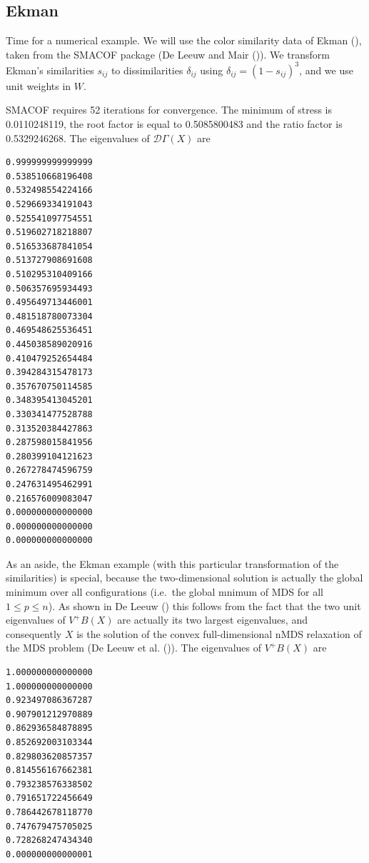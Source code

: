 \documentclass[
  12pt,
  letterpaper,
  DIV=11,
  numbers=noendperiod]{scrartcl}
\begin{document}
\subsection{Ekman}\label{ekman}

Time for a numerical example. We will use the color similarity data of
Ekman (), taken from the SMACOF package (De
Leeuw and Mair ()). We transform
Ekman's similarities \(s_{ij}\) to dissimilarities \(\delta_{ij}\) using
\(\delta_{ij}=(1-s_{ij})^3\), and we use unit weights in \(W\).

SMACOF requires 52 iterations for convergence. The minimum of stress is
0.0110248119, the root factor is equal to 0.5085800483 and the ratio
factor is 0.5329246268. The eigenvalues of \(\mathcal{D}\Gamma(X)\) are

\begin{verbatim}
0.999999999999999 
0.538510668196408 
0.532498554224166 
0.529669334191043 
0.525541097754551 
0.519602718218807 
0.516533687841054 
0.513727908691608 
0.510295310409166 
0.506357695934493 
0.495649713446001 
0.481518780073304 
0.469548625536451 
0.445038589020916 
0.410479252654484 
0.394284315478173 
0.357670750114585 
0.348395413045201 
0.330341477528788 
0.313520384427863 
0.287598015841956 
0.280399104121623 
0.267278474596759 
0.247631495462991 
0.216576009083047 
0.000000000000000 
0.000000000000000 
0.000000000000000 
\end{verbatim}

As an aside, the Ekman example (with this particular transformation of
the similarities) is special, because the two-dimensional solution is
actually the global minimum over all configurations (i.e.~the global
mnimum of MDS for all \(1\leq p\leq n\)). As shown in De Leeuw
() this follows from the fact that the
two unit eigenvalues of \(V^+B(X)\) are actually its two largest
eigenvalues, and consequently \(X\) is the solution of the convex
full-dimensional nMDS relaxation of the MDS problem (De Leeuw et al.
()). The eigenvalues of
\(V^+B(X)\) are

\begin{verbatim}
1.000000000000000 
1.000000000000000 
0.923497086367287 
0.907901212970889 
0.862936584878895 
0.852692003103344 
0.829803620857357 
0.814556167662381 
0.793238576338502 
0.791651722456649 
0.786442678118770 
0.747679475705025 
0.728268247434340 
0.000000000000001 
\end{verbatim}
\end{document}
